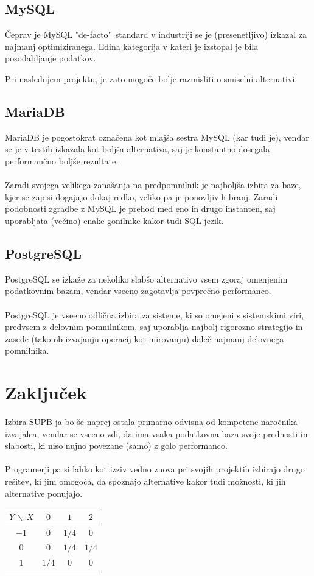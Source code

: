\documentclass[a4paper,11pt]{report}
\begin{document}
\subsection{MySQL}
Čeprav je MySQL "de-facto"\ standard v industriji se je (presenetljivo) izkazal za najmanj optimiziranega.
Edina kategorija v kateri je izstopal je bila posodabljanje podatkov. 

Pri naslednjem projektu, je zato mogoče bolje razmisliti o smiselni alternativi.

\subsection{MariaDB}
MariaDB je pogostokrat označena kot mlajša sestra MySQL (kar tudi je), vendar se je v testih izkazala kot boljša alternativa, saj je konstantno dosegala performančno boljše rezultate.
\\\\
Zaradi svojega velikega zanašanja na predpomnilnik je najboljša izbira za baze, kjer se zapisi dogajajo dokaj redko, veliko pa je ponovljivih branj.
Zaradi podobnosti zgradbe z MySQL je prehod med eno in drugo instanten, saj uporabljata (večino) enake gonilnike kakor
tudi SQL jezik.

\pagebreak

\subsection{PostgreSQL}
PostgreSQL se izkaže za nekoliko slabšo alternativo vsem zgoraj omenjenim podatkovnim bazam, vendar vseeno zagotavlja povprečno performanco.
\\\\
PostgreSQL je vseeno odlična izbira za sisteme, ki so omejeni s sistemskimi viri, predvsem z delovnim pomnilnikom, saj uporablja najbolj rigorozno strategijo in zasede (tako ob izvajanju operacij kot mirovanju) daleč najmanj delovnega pomnilnika.

\section{Zaključek}
Izbira SUPB-ja bo še naprej ostala primarno odvisna od kompetenc naročnika-izvajalca, vendar se vseeno zdi, da ima vsaka podatkovna baza svoje prednosti in slabosti, ki niso nujno povezane (samo) z golo performanco.
\\\\
Programerji pa si lahko kot izziv vedno znova pri svojih projektih izbirajo drugo rešitev, ki jim omogoča, da spoznajo alternative kakor tudi možnosti, ki jih alternative ponujajo.


\begin{tabular}{|c|c|c|c|} \hline $Y\ \backslash\ X$& $0$ & $1$ & $2$ \\ \hline $-1$& $0$ & $1/4$& $0$ \\ \hline $0$& $0$ & $1/4$ & $1/4$ \\ \hline $1$& $1/4$& $0$ & $0$ \\ \hline \end{tabular}
\end{document}
